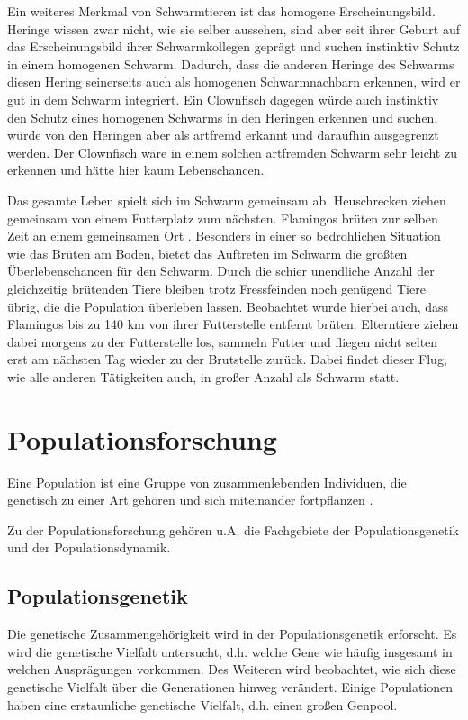 \documentclass[draft=false
              ,paper=a4
              ,twoside=false
              ,fontsize=11pt
              ,headsepline
              ,BCOR10mm
              ,DIV11
              ,bibtotoc
              ,liststotoc
              ]{scrbook}
\begin{document}
Ein weiteres Merkmal von Schwarmtieren ist das homogene Erscheinungsbild. Heringe wissen zwar nicht, wie sie selber aussehen, sind aber seit ihrer Geburt auf das Erscheinungsbild ihrer Schwarmkollegen geprägt und suchen instinktiv Schutz in einem homogenen Schwarm. Dadurch, dass die anderen Heringe des Schwarms diesen Hering seinerseits auch als homogenen Schwarmnachbarn erkennen, wird er gut in dem Schwarm integriert. Ein Clownfisch dagegen würde auch instinktiv den Schutz eines homogenen Schwarms in den Heringen erkennen und suchen, würde von den Heringen aber als artfremd erkannt und daraufhin ausgegrenzt werden. Der Clownfisch wäre in einem solchen artfremden Schwarm sehr leicht zu erkennen und hätte hier kaum Lebenschancen.

Das gesamte Leben spielt sich im Schwarm gemeinsam ab. Heuschrecken ziehen gemeinsam von einem Futterplatz zum nächsten. Flamingos brüten zur selben Zeit an einem gemeinsamen Ort \cite{flamingo}. Besonders in einer so bedrohlichen Situation wie das Brüten am Boden, bietet das Auftreten im Schwarm die größten Überlebenschancen für den Schwarm. Durch die schier unendliche Anzahl der gleichzeitig brütenden Tiere bleiben trotz Fressfeinden noch genügend Tiere übrig, die die Population überleben lassen. Beobachtet wurde hierbei auch, dass Flamingos bis zu 140 km von ihrer Futterstelle entfernt brüten. Elterntiere ziehen dabei morgens zu der Futterstelle los, sammeln Futter und fliegen nicht selten erst am nächsten Tag wieder zu der Brutstelle zurück\cite{flamingo}. Dabei findet dieser Flug, wie alle anderen Tätigkeiten auch, in großer Anzahl als Schwarm statt.

\section{Populationsforschung}
Eine Population ist eine Gruppe von zusammenlebenden Individuen, die genetisch zu einer Art gehören und sich miteinander fortpflanzen \cite{genetik}.

Zu der Populationsforschung gehören u.A. die Fachgebiete der Populationsgenetik und der Populationsdynamik.
\subsection{Populationsgenetik}
Die genetische Zusammengehörigkeit wird in der Populationsgenetik erforscht. Es wird die genetische Vielfalt untersucht, d.h. welche Gene wie häufig insgesamt in welchen Ausprägungen vorkommen. Des Weiteren wird beobachtet, wie sich diese genetische Vielfalt über die Generationen hinweg verändert. Einige Populationen haben eine erstaunliche genetische Vielfalt, d.h. einen großen Genpool.
\end{document}
